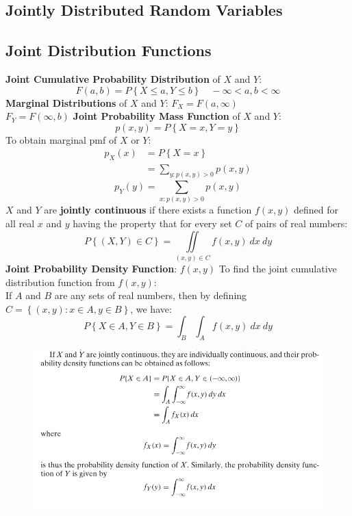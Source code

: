 \documentclass[openany]{book}
\numberwithin{equation}{section}
\begin{document}
\begin{flushleft}
\chapter{Jointly Distributed Random Variables}
\section{Joint Distribution Functions}
\textbf{Joint Cumulative Probability Distribution} of $X$ and $Y$:
\[F(a,b)=P\left\{X \leq a,Y \leq b \right\} \quad -\infty < a,b < \infty
\]
\textbf{Marginal Distributions} of $X$ and $Y$: \medbreak
$F_X=F(a,\infty)$ \\
$F_Y=F(\infty,b)$ \medbreak
\textbf{Joint Probability Mass Function} of $X$ and $Y$:
\[p(x,y)=P\left\{X=x,Y=y \right\}
\]
To obtain marginal pmf of $X$ or $Y$:
\begin{align*}
p_X(x) &=P\left\{X=x \right\}\\
&= \sum_{y:p(x,y)>0}p(x,y)
\end{align*}
\begin{equation*}
p_Y(y)= \sum_{x:p(x,y)>0}p(x,y)
\end{equation*}
$X$ and $Y$ are \textbf{jointly continuous} if there exists a function $f(x,y)$ defined for all real $x$ and $y$ having the property that for every set $C$ of pairs of real numbers:
\[P\left\{(X,Y) \in C \right\}=\iint\limits_{(x,y)\in C} f(x,y)  \ dx \ dy
\]
\textbf{Joint Probability Density Function}: $f(x,y)$ \medbreak
To find the joint cumulative distribution function from $f(x,y)$:\\
If $A$ and $B$ are any sets of real numbers, then by defining $C=\left\{(x,y): x\in A, y \in B \right\}$, we have:
\[P\left\{X \in A, Y \in B \right\}=\int_B \int_A f(x,y) \ dx \ dy
\]
\begin{figure}[H]
\includegraphics[scale=.7]{jointxy.png}
\end{figure}

\end{flushleft}
\end{document}
